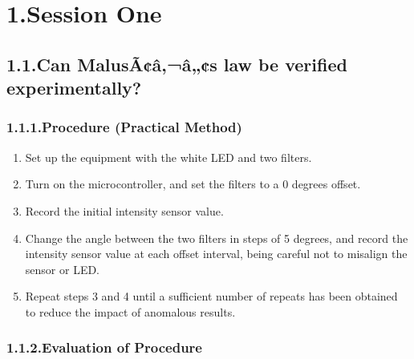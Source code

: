 \documentclass{article}
\begin{document}
\section{1.\hspace*{0.5em}Session One}\label{sec-session-one}%

\subsection{1.1.\hspace*{0.5em}Can MalusÃ¢â‚¬â„¢s law be verified experimentally?}\label{sec-can-maluss-law-be-verified-experimentally}%

\subsubsection{1.1.1.\hspace*{0.5em}Procedure (Practical Method)}\label{sec-procedure-practical-method}%

\begin{enumerate}[noitemsep,topsep=\mdcompacttopsep]%

\item{}Set up the equipment with the white LED and two filters.%

\item{}Turn on the microcontroller, and set the filters to a 0 degrees offset.%

\item{}Record the initial intensity sensor value.%

\item{}Change the angle between the two filters in steps of 5 degrees, and record the intensity sensor value at each offset interval, being careful not to misalign the sensor or LED.%

\item{}Repeat steps 3 and 4 until a sufficient number of repeats has been obtained to reduce the impact of anomalous results.%
\end{enumerate}%

\subsubsection{1.1.2.\hspace*{0.5em}Evaluation of Procedure}\label{sec-evaluation-of-procedure}%
\end{document}
